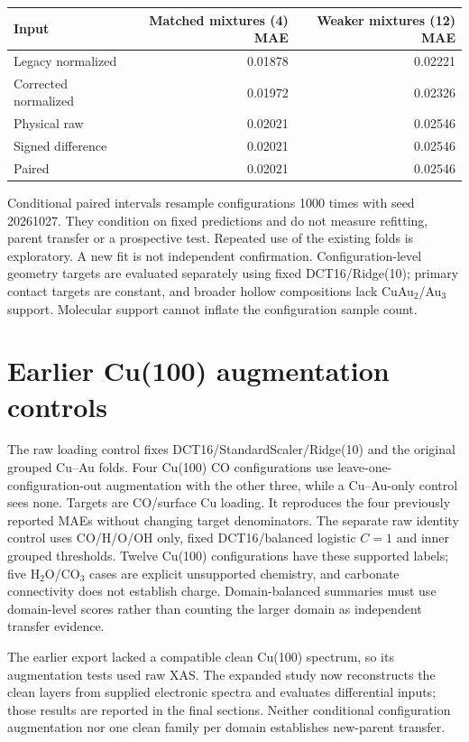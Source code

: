 \documentclass[11pt,a4paper]{article}
\begin{document}
\begin{center}\small\begin{tabular}{lrr}\toprule
Input & Matched mixtures (4) MAE & Weaker mixtures (12) MAE\\\midrule
Legacy normalized & 0.01878 & 0.02221\\
Corrected normalized & 0.01972 & 0.02326\\
Physical raw & 0.02021 & 0.02546\\
Signed difference & 0.02021 & 0.02546\\
Paired & 0.02021 & 0.02546\\
\bottomrule\end{tabular}\end{center}
Conditional paired intervals resample configurations 1000 times with seed 20261027. They condition on fixed predictions and do not measure refitting, parent transfer or a prospective test. Repeated use of the existing folds is exploratory. A new fit is not independent confirmation. Configuration-level geometry targets are evaluated separately using fixed DCT16/Ridge(10); primary contact targets are constant, and broader hollow compositions lack CuAu$_2$/Au$_3$ support. Molecular support cannot inflate the configuration sample count.

\section{Earlier Cu(100) augmentation controls}
The raw loading control fixes DCT16/StandardScaler/Ridge(10) and the original grouped Cu--Au folds. Four Cu(100) CO configurations use leave-one-configuration-out augmentation with the other three, while a Cu--Au-only control sees none. Targets are CO/surface Cu loading. It reproduces the four previously reported MAEs without changing target denominators. The separate raw identity control uses CO/H/O/OH only, fixed DCT16/balanced logistic $C=1$ and inner grouped thresholds. Twelve Cu(100) configurations have these supported labels; five H$_2$O/CO$_3$ cases are explicit unsupported chemistry, and carbonate connectivity does not establish charge. Domain-balanced summaries must use domain-level scores rather than counting the larger domain as independent transfer evidence.

The earlier export lacked a compatible clean Cu(100) spectrum, so its augmentation tests used raw XAS. The expanded study now reconstructs the clean layers from supplied electronic spectra and evaluates differential inputs; those results are reported in the final sections. Neither conditional configuration augmentation nor one clean family per domain establishes new-parent transfer.
\end{document}
